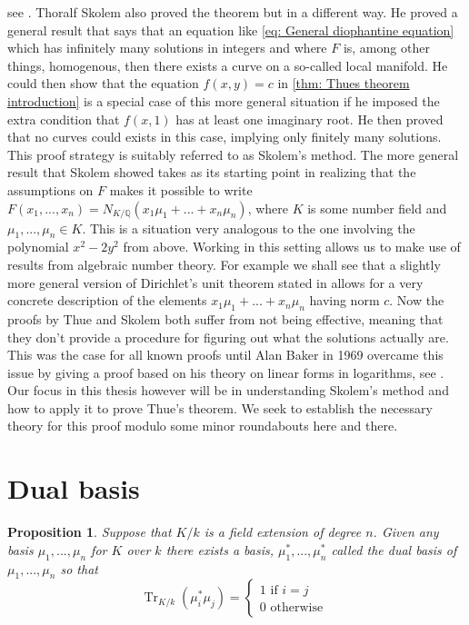 \documentclass{article}
\DeclareMathOperator{\tr}{Tr}
\newtheorem{proposition}{Proposition}[section]
\newcommand{\mbb}[1]{\mathbb{#1}}
\numberwithin{equation}{section}
\begin{document}
see \citep{thuewikipedia}. Thoralf Skolem also proved the theorem but in a different way. He proved a general result that says that an equation like \cref{eq: General diophantine equation} which has infinitely many solutions in integers and where $F$ is, among other things, homogenous, then there exists a curve on a so-called local manifold. He could then show that the equation $f(x,y) = c$ in \cref{thm: Thues theorem introduction} is a special case of this more general situation if he imposed the extra condition that $f(x,1)$ has at least one imaginary root. He then proved that no curves could exists in this case, implying only finitely many solutions. This proof strategy is suitably referred to as Skolem's method. The more general result that Skolem showed takes as its starting point in realizing that the assumptions on $F$ makes it possible to write $F(x_1, ..., x_n) = N_{K/\mbb Q}{(x_1\mu_1 + ... + x_n \mu_n)}$, where $K$ is some number field and $\mu_1, ..., \mu_n \in K$. This is a situation very analogous to the one involving the polynomial $x^2 - 2y^2$ from above. Working in this setting allows us to make use of results from algebraic number theory. For example we shall see that a slightly more general version of Dirichlet's unit theorem stated in \citep[Theorem 38]{marcus} allows for a very concrete description of the elements $x_1\mu_1 + ... + x_n \mu_n$  having norm $c$. Now the proofs by Thue and Skolem both suffer from not being effective, meaning that they don't provide a procedure for figuring out what the solutions actually are. This was the case for all known proofs until Alan Baker in 1969 overcame this issue by giving a proof based on his theory on linear forms in logarithms, see \citep[Theorem 4.1]{baker}. Our focus in this thesis however will be in understanding Skolem's method and how to apply it to prove Thue's theorem. We seek to establish the necessary theory for this proof modulo some minor roundabouts here and there.
\section{Dual basis}
\begin{proposition}\label{prop: Existence of dual basis}
	Suppose that $K/k$ is a field extension of degree $n$. Given any basis $\mu_1, ..., \mu_n$ for $K$ over $k$ there exists a basis, $\mu_1^*, ..., \mu_n^*$ called the dual basis of $\mu_1, ..., \mu_n$ so that
	$$\tr_{K/k}(\mu_i^* \mu_j) = \begin{cases*}
        	1 \text{ if } i = j \\
        	0 \text{ otherwise }
    	\end{cases*}$$
\end{proposition}
\end{document}
